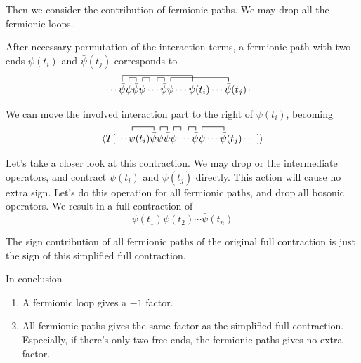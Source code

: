 \documentclass[12pt]{book}
\begin{document}
	Then we consider the contribution of fermionic paths. We may drop all the fermionic loops.
	
	After necessary permutation of the interaction terms, a fermionic path with two ends $\psi(t_i)$ and $\bar\psi(t_j)$ corresponds to
	\begin{equation}
		\contraction[1.5ex]{\cdots}{\bar\psi}{\psi\bar\psi\psi\cdots\bar\psi\psi\cdots}{\psi}
		\contraction[1ex]{\cdots\bar\psi}{\bar\psi}{}{\bar\psi}
		\contraction[1ex]{\cdots\bar\psi\psi\bar\psi}{\bar\psi}{}{\psi}
		\contraction[1ex]{\cdots\bar\psi\psi\bar\psi\quad\,\,\,}{\bar\psi}{}{\bar\psi}
		\contraction[1ex]{\cdots\bar\psi\psi\bar\psi\psi\cdots\bar\psi}{\bar\psi}{\cdots\psi(t_i)\cdots}{\bar\psi}
		\cdots\bar\psi\psi\bar\psi\psi\cdots\bar\psi\psi\cdots\psi(t_i)\cdots\bar\psi(t_j)\cdots
	\end{equation}
	
	We can move the involved interaction part to the right of $\psi(t_i)$, becoming
	\begin{equation}
		\contraction[1ex]{\langle T[\cdots}{\bar\psi}{(t_i)}{\bar\psi}
		\contraction[1ex]{\langle T[\cdots\psi(t_i)\bar\psi}{\bar\psi}{}{\bar\psi}
		\contraction[1ex]{\langle T[\cdots\psi(t_i)\bar\psi\psi\bar\psi}{\bar\psi}{}{\psi}
		\contraction[1ex]{\langle T[\cdots\psi(t_i)\bar\psi\psi\bar\psi\quad\,\,\,}{\bar\psi}{}{\bar\psi}
		\contraction[1ex]{\langle T[\cdots\psi(t_i)\bar\psi\psi\bar\psi\psi\cdots\bar\psi}{\bar\psi}{\cdots}{\bar\psi}
		\langle T[\cdots\psi(t_i)\bar\psi\psi\bar\psi\psi\cdots\bar\psi\psi\cdots\bar\psi(t_j)\cdots]\rangle
	\end{equation}
	
	Let's take a closer look at this contraction. We may drop or the intermediate operators, and contract $\psi(t_i)$ and $\bar\psi(t_j)$ directly. This action will cause no extra sign. Let's do this operation for all fermionic paths, and drop all bosonic operators. We result in a full contraction of
	\begin{equation}
		\psi(t_1)\psi(t_2)\cdots \bar\psi(t_n)
	\end{equation}
	
	The sign contribution of all fermionic paths of the original full contraction is just the sign of this simplified full contraction.
	
	In conclusion
	\begin{enumerate}
		\item A fermionic loop gives a $-1$ factor.
		\item All fermionic paths gives the same factor as the simplified full contraction. Especially, if there's only two free ends, the fermionic paths gives no extra factor.
	\end{enumerate}
	
\end{document}
